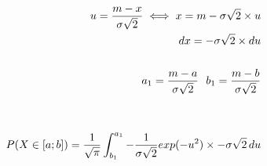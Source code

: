 \documentclass[preview]{standalone}
\begin{document}
\begin{align*}
u = {{m - x} \over {\sigma \sqrt{2}} } \iff x = m - \sigma \sqrt{2} \times u \\ dx = - \sigma \sqrt{2} \times du \\ \\ a_1 = {{m - a} \over {\sigma \sqrt{2}} } \, \, \, \, b_1 = {{m - b} \over {\sigma \sqrt{2}} } \\ \\ \\ P( X \in [a;b] ) = { \frac{1}{\sqrt{\pi}} } \int_{b_1}^{a_1} { { - \frac{1}{\sigma \sqrt{2}} } exp( -u^2 ) \times - \sigma \sqrt{2} } \, du
\end{align*}
\end{document}

